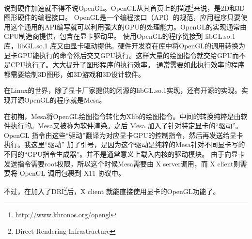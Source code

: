 说到硬件加速就不得不说OpenGL。OpenGL从其首页上的描述\footnote{ \url{http://www.khronos.org/opengl} }来说，是2D和3D图形硬件的编程接口。
OpenGL是一个编程接口（API）的规范，应用程序只要使用这个通用的API编写就可以利用强大的GPU的处理能力。OpenGL的实现通常由GPU制造商提供，包含在显卡驱动里。
使用OpenGL的程序链接到 libGL.so.1 库，libGL.so.1 库又由显卡驱动提供。硬件开发商在库中将OpenGL的调用转换为显卡GPU能执行的命令然后交又GPU执行。这样大量的绘图指令就交给GPU而不是CPU执行了。大大提升了图形程序的执行效率。
通常需要如此执行效率的程序都需要绘制3D图形，如3D游戏和3D设计软件。

在Linux的世界，除了显卡厂家提供的闭源的libGL.so.1实现，还有开源的实现。实现开源OpenGL的程序就是Mesa。

在初期，Mesa将OpenGL绘图指令转化为Xlib的绘图指令。中间的转换纯粹是由软件执行的。Mesa又被称为软件渲染。之后 Mesa 加入了针对特定显卡的“驱动”。OpenGL 指令由这些“驱动”翻译为对应显卡GPU的控制指令，然后再发送给显卡执行。我这里“驱动” 加了引号，是因为这个驱动是纯粹的Mesa针对不同显卡写的不同的“GPU指令生成器”。并不是通常意义上载入内核的驱动模块。
由于向显卡发送指令需要root权限，所以这个时候Mesa需要由 X server调用，而 X client则需要将 OpenGL 调用包裹到 X11 协议中。

不过，在加入了DRI\footnote{Direct Rendering Infrastructure}后，X client 就能直接使用显卡的OpenGL功能了。

